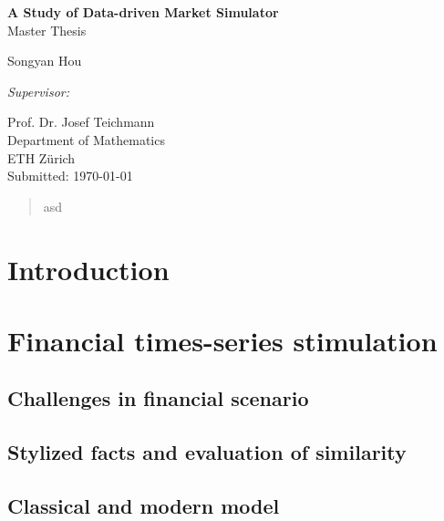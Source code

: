 \documentclass[12pt]{report}
\theoremstyle{definition}
\theoremstyle{remark}
\begin{document}
\begin{titlepage}
   \begin{center}
       \LARGE
       \textbf{A Study of Data-driven Market Simulator}
       \\
       \vspace{2cm}
       \Large Master Thesis
 
       \vspace{1.5cm}

       \Large
       Songyan Hou\\
 
       \vfill

       
       \textit{\large Supervisor:}\\
       \large

       Prof. Dr. Josef Teichmann\\
       \normalsize
       Department of Mathematics\\
       ETH Z\"urich\\

       \vspace{0.8cm}
       Submitted: \today
 
   \end{center}
\end{titlepage}

\begin{abstract}
  asd
\end{abstract}

\tableofcontents
\chapter{Introduction}

\chapter{Financial times-series stimulation}
\section{Challenges in financial scenario}
\section{Stylized facts and evaluation of similarity}
\section{Classical and modern model}
\end{document}
